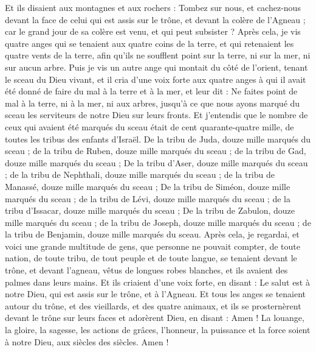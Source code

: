 \begin{multicols}{2}
Et ils disaient aux montagnes et aux rochers : Tombez sur nous, et cachez-nous devant la face de celui qui est assis sur le trône, et devant la colère de l'Agneau ;
car le grand jour de sa colère est venu, et qui peut subsister ?
\VerseOne{}Après cela, je vis quatre anges qui se tenaient aux quatre coins de la terre, et qui retenaient les quatre vents de la terre, afin qu'ils ne soufflent point sur la terre, ni sur la mer, ni sur aucun arbre.
Puis je vis un autre ange qui montait du côté de l'orient, tenant le sceau du Dieu vivant, et il cria d'une voix forte aux quatre anges à qui il avait été donné de faire du mal à la terre et à la mer,
et leur dit : Ne faites point de mal à la terre, ni à la mer, ni aux arbres, jusqu'à ce que nous ayons marqué du sceau les serviteurs de notre Dieu sur leurs fronts.
Et j'entendis que le nombre de ceux qui avaient été marqués du sceau était de cent quarante-quatre mille, de toutes les tribus des enfants d'Israël.
De la tribu de Juda, douze mille marqués du sceau ; de la tribu de Ruben, douze mille marqués du sceau ; de la tribu de Gad, douze mille marqués du sceau ;
De la tribu d'Aser, douze mille marqués du sceau ; de la tribu de Nephthali, douze mille marqués du sceau ; de la tribu de Manassé, douze mille marqués du sceau ;
De la tribu de Siméon, douze mille marqués du sceau ; de la tribu de Lévi, douze mille marqués du sceau ; de la tribu d'Issacar, douze mille marqués du sceau ;
De la tribu de Zabulon, douze mille marqués du sceau ; de la tribu de Joseph, douze mille marqués du sceau ; de la tribu de Benjamin, douze mille marqués du sceau.
Après cela, je regardai, et voici une grande multitude de gens, que personne ne pouvait compter, de toute nation, de toute tribu, de tout peuple et de toute langue, se tenaient devant le trône, et devant l'agneau, vêtus de longues robes blanches, et ils avaient des palmes dans leurs mains.
Et ils criaient d'une voix forte, en disant : Le salut est à notre Dieu, qui est assis sur le trône, et à l'Agneau.
Et tous les anges se tenaient autour du trône, et des vieillards, et des quatre animaux, et ils se prosternèrent devant le trône sur leurs faces et adorèrent Dieu,
en disant : Amen ! La louange, la gloire, la sagesse, les actions de grâces, l'honneur, la puissance et la force soient à notre Dieu, aux siècles des siècles. Amen !

\end{multicols}
